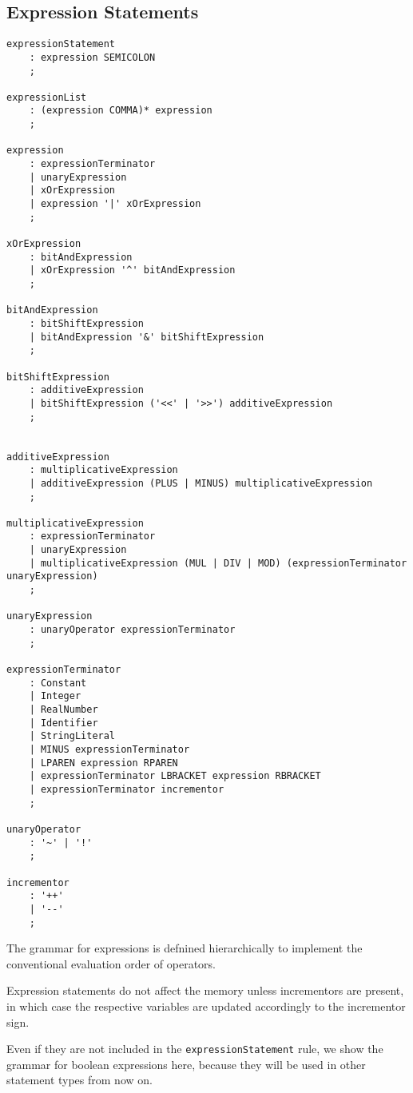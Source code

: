 \documentclass[12pt,a4paper]{report}
\theoremstyle{definition}
\theoremstyle{definition}
\theoremstyle{definition}
\begin{document}
\subsection{Expression Statements}
\begin{lstlisting}
expressionStatement
    : expression SEMICOLON
    ;
    
expressionList
    : (expression COMMA)* expression
    ;

expression
    : expressionTerminator
    | unaryExpression
    | xOrExpression
    | expression '|' xOrExpression
    ;

xOrExpression
    : bitAndExpression
    | xOrExpression '^' bitAndExpression
    ;

bitAndExpression
    : bitShiftExpression
    | bitAndExpression '&' bitShiftExpression
    ;

bitShiftExpression
    : additiveExpression
    | bitShiftExpression ('<<' | '>>') additiveExpression
    ;

    
additiveExpression
    : multiplicativeExpression
    | additiveExpression (PLUS | MINUS) multiplicativeExpression
    ;

multiplicativeExpression
    : expressionTerminator
    | unaryExpression
    | multiplicativeExpression (MUL | DIV | MOD) (expressionTerminator unaryExpression)
    ;

unaryExpression
    : unaryOperator expressionTerminator
    ;

expressionTerminator
    : Constant
    | Integer
    | RealNumber
    | Identifier
    | StringLiteral
    | MINUS expressionTerminator
    | LPAREN expression RPAREN
    | expressionTerminator LBRACKET expression RBRACKET
    | expressionTerminator incrementor
    ;

unaryOperator
    : '~' | '!'
    ;

incrementor
    : '++'
    | '--'
    ;
\end{lstlisting}

The grammar for expressions is defnined hierarchically to implement the conventional evaluation order of operators.

Expression statements do not affect the memory unless incrementors are present, in which case the respective variables are updated accordingly to the incrementor sign.

\pagebreak

Even if they are not included in the \texttt{expressionStatement} rule, we show the grammar for boolean expressions here, because they will be used in other statement types from now on.
\end{document}
